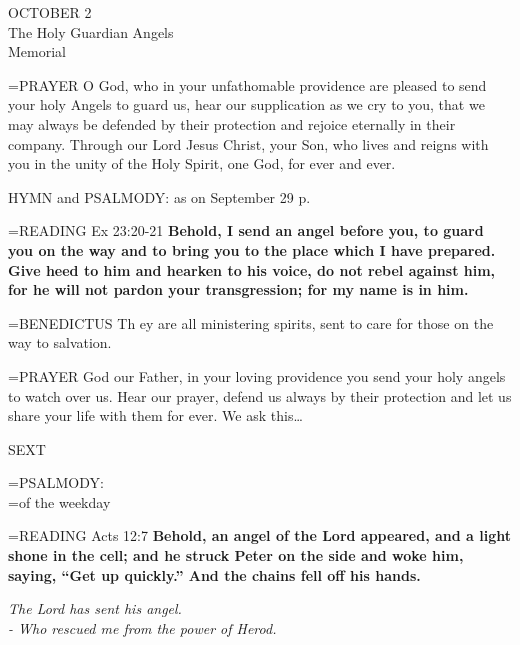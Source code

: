 \begin{center}\normalsize OCTOBER 2\\
\footnotesize The Holy Guardian Angels\\
\footnotesize Memorial\\
\end{center}

\hangindent=\parindent \small{PRAYER 
O God, who in your unfathomable providence
are pleased to send your holy Angels to guard us,
hear our supplication as we cry to you,
that we may always be defended by their protection
and rejoice eternally in their company.
Through our Lord Jesus Christ, your Son,
who lives and reigns with you in the unity of the Holy Spirit,
one God, for ever and ever.\\}
 
HYMN and PSALMODY: as on September 29 p. \pageref{archangels:hymn}

\hangindent=\parindent \small{READING} Ex 23:20-21 \textbf{Behold, I send an angel before you, to guard you
on the way and to bring you to the place which I have prepared.
Give heed to him and hearken to his voice, do not rebel against
him, for he will not pardon your transgression; for my name is in
him.\\}
 
\hangindent=\parindent \small{BENEDICTUS  Th ey are all ministering spirits, sent to care for those on
the way to salvation.\\}
 
\hangindent=\parindent \small{PRAYER  God our Father, in your loving providence you send your
holy angels to watch over us. Hear our prayer, defend us always by
their protection and let us share your life with them for ever. We ask
this…\\}
 
\begin{flushleft}\normalsize SEXT\\\end{flushleft}

\hangindent=\parindent \small{PSALMODY:}\\
\hangindent=\parindent  of the weekday\vspace{0.5em}

\hangindent=\parindent \small{READING} Acts 12:7 \textbf{Behold, an angel of the Lord appeared, and a light
shone in the cell; and he struck Peter on the side and woke him,
saying, “Get up quickly.” And the chains fell off his hands.}
 
\begin{center}
\textit{The Lord has sent his angel.\\
- Who rescued me from the power of Herod.}
\end{center}

